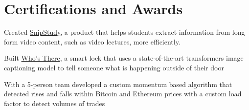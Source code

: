 \documentclass[]{resume-template}
\begin{document}
\begin{minipage}[t]{0.66\textwidth}


        \section{Certifications and Awards}\label{sec:certifications-and-awards}
        \begin{tightemize}
            \item Created \href{https://devpost.com/software/snipstudy}{SnipStudy}, a product that helps students extract information from long form video content, such as video lectures, more efficiently. 
        \end{tightemize}
        \begin{tightemize}
            \item Built \href{https://devpost.com/software/who-s-there-wkdheg}{Who's There}, a smart lock that uses a state-of-the-art transformers image captioning model to tell someone what is happening outside of their door
        \end{tightemize}
        \sectionsep{}
        \begin{tightemize}
            \item With a 5-person team developed a custom momentum based algorithm that detected rises and falls within
            Bitcoin and Ethereum prices with a custom load factor to detect volumes of trades

\end{tightemize}
\end{minipage}
\end{document}
